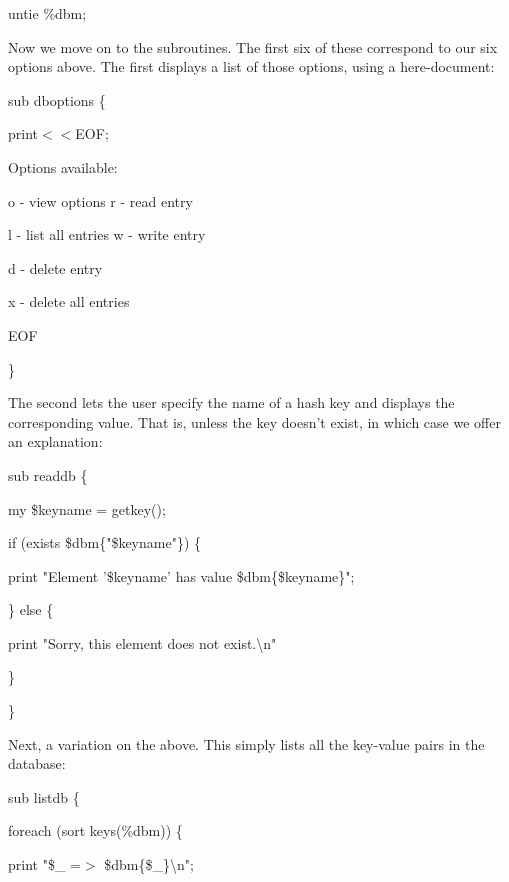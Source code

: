 \documentclass[a4paper,11pt]{book}
\begin{document}
\noindent 

\noindent 

\noindent untie \%dbm;

\noindent 

\noindent Now we move on to the subroutines. The first six of these correspond to our six options above. The first displays a list of those options, using a here-document:

\noindent 

\noindent sub dboptions \{

\noindent print$<$$<$EOF;

\noindent Options available:

\noindent o - view options r - read entry

\noindent l - list all entries w - write entry

\noindent d - delete entry

\noindent x - delete all entries

\noindent EOF

\noindent \}

\noindent 

\noindent The second lets the user specify the name of a hash key and displays the corresponding value. That is, unless the key doesn't exist, in which case we offer an explanation:

\noindent 

\noindent sub readdb \{

\noindent my \$keyname = getkey();

\noindent if (exists \$dbm\{"\$keyname"\}) \{

\noindent print "Element '\$keyname' has value \$dbm\{\$keyname\}";

\noindent \} else \{

\noindent print "Sorry, this element does not exist.\textbackslash n"

\noindent \}

\noindent \}

\noindent 

\noindent 

\noindent Next, a variation on the above. This simply lists all the key-value pairs in the database:

\noindent 

\noindent sub listdb \{

\noindent foreach (sort keys(\%dbm)) \{

\noindent print "\$\_  =$>$ \$dbm\{\$\_\}\textbackslash n";
\end{document}
